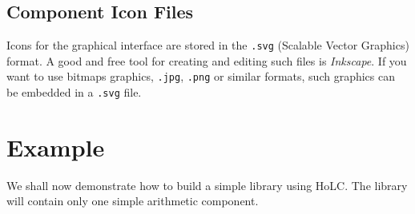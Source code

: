 \documentclass[a4paper,pdftex]{article}
\begin{document}
\subsection*{Component Icon Files}
Icons for the graphical interface are stored in the \texttt{.svg} (Scalable Vector Graphics) format. A good and free tool for creating and editing such files is \textit{Inkscape}. If you want to use bitmaps graphics, \texttt{.jpg}, \texttt{.png} or similar formats, such graphics can be embedded in a \texttt{.svg} file.

\section*{Example}
We shall now demonstrate how to build a simple library using HoLC. The library will contain only one simple arithmetic component.
\end{document}
